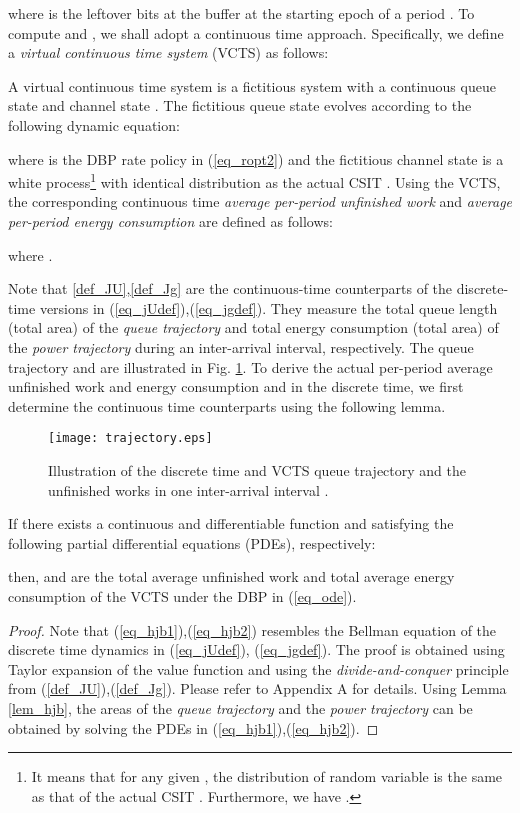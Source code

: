 \documentclass[11pt,journal, onecolumn]{./IEEEtran}
\newcommand{\black}{\color{black}}
\newcommand{\red}{\color{black}}
\begin{document}
where  is the leftover bits at the buffer at the starting epoch of a period . To compute  and , we shall adopt a continuous time approach. Specifically, we define a {\em virtual continuous time system} (VCTS) as follows:
\begin{Definition}
A virtual continuous time system is a fictitious system with a continuous queue state  and channel state . The fictitious queue state evolves according to the following dynamic equation:

where  is the DBP rate policy in (\ref{eq_ropt2}) and the fictitious channel state is a white process\footnote{\red It means that for any given , the distribution of random variable  is the same as that of the actual CSIT . Furthermore, we have
.} with identical distribution as the actual CSIT . Using the VCTS, the corresponding continuous time \emph{average per-period unfinished work}  and \emph{average per-period energy consumption}  are defined as follows:


where . ~\hfill\IEEEQED
\end{Definition}

{\red Note that \eqref{def_JU},\eqref{def_Jg} are the continuous-time counterparts of the discrete-time versions in (\eqref{eq_jUdef}),(\eqref{eq_jgdef}). They measure the total queue length (total area) of the {\em queue trajectory} and total energy consumption (total area) of the {\em power trajectory} during an inter-arrival interval, respectively. The queue trajectory and  are illustrated in Fig. \ref{fig_trajectory}. } \black To derive the actual per-period average unfinished work and energy consumption  and  in the discrete time, we first determine the continuous time counterparts using the following lemma.


\begin{figure}[t!]
\centering
\texttt{[image: trajectory.eps]}
\caption{{\red Illustration of the discrete time and VCTS queue trajectory and the unfinished works  in one inter-arrival interval . } \black} \label{fig_trajectory}
\end{figure}


\begin{Lemma}[Verification Lemma of  and  {\red in VCTS}]\label{lem_hjb}
If there exists a continuous and differentiable function  and  satisfying the following partial differential equations (PDEs), respectively:


then,  and  are the total average unfinished work and total average energy consumption of the VCTS under the DBP in (\ref{eq_ode}). ~\hfill\IEEEQED
\end{Lemma}
\begin{proof}
{\red Note that (\ref{eq_hjb1}),(\ref{eq_hjb2}) resembles the Bellman equation of the discrete time dynamics in (\ref{eq_jUdef}), (\ref{eq_jgdef}). The proof is obtained using Taylor expansion of the value function and using the {\em divide-and-conquer} principle from (\ref{def_JU}),(\ref{def_Jg}). Please refer to Appendix A for details. Using Lemma \ref{lem_hjb}, the areas of the {\em queue trajectory} and the {\em power trajectory} can be obtained by solving the PDEs in (\ref{eq_hjb1}),(\ref{eq_hjb2}).}
\end{proof}
\end{document}
